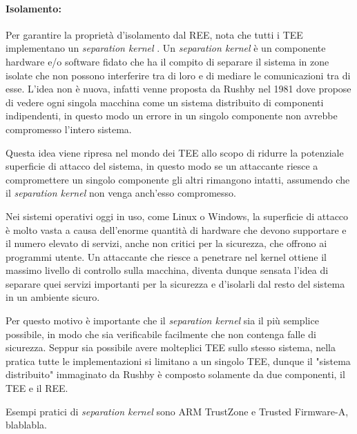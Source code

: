 \documentclass[12pt,italian]{report}
\begin{document}
\paragraph{Isolamento:}
Per garantire la proprietà d'isolamento dal REE, \cite{sabt2015tee} nota
che tutti i TEE implementano un \textit{separation kernel}
\cite{rushby1981separationkernel}. 
Un \textit{separation kernel} è un componente hardware e/o software fidato che
ha il compito di separare il sistema in zone isolate che non possono
interferire tra di loro e di mediare le comunicazioni tra di esse.
L'idea non è nuova, infatti venne proposta da Rushby nel 1981 dove propose
di vedere ogni singola macchina come un sistema distribuito di componenti
indipendenti, in questo modo un errore in un singolo componente non avrebbe
compromesso l'intero sistema.

Questa idea viene ripresa nel mondo dei TEE allo scopo di ridurre la
potenziale superficie di attacco del sistema, in questo modo se un
attaccante riesce a compromettere un singolo componente gli altri rimangono
intatti, assumendo che il \textit{separation kernel} non venga anch'esso
compromesso.

Nei sistemi operativi oggi in uso, come Linux o Windows, la superficie di
attacco è molto vasta a causa dell'enorme quantità di hardware che devono
supportare e il numero elevato di servizi, anche non critici per la sicurezza,
che offrono ai programmi utente. 
Un attaccante che riesce a penetrare nel kernel ottiene il massimo livello di
controllo sulla macchina, diventa dunque sensata l'idea di separare quei
servizi importanti per la sicurezza e d'isolarli dal resto del sistema in
un ambiente sicuro.

Per questo motivo è importante che il \textit{separation kernel} sia
il più semplice possibile, in modo che sia verificabile facilmente che non
contenga falle di sicurezza.
Seppur sia possibile avere molteplici TEE sullo stesso sistema, nella pratica
tutte le implementazioni si limitano a un singolo TEE, dunque il
"sistema distribuito" immaginato da Rushby è composto solamente da due
componenti, il TEE e il REE.

Esempi pratici di \textit{separation kernel} sono ARM TrustZone e
Trusted Firmware-A, blablabla.
\end{document}
